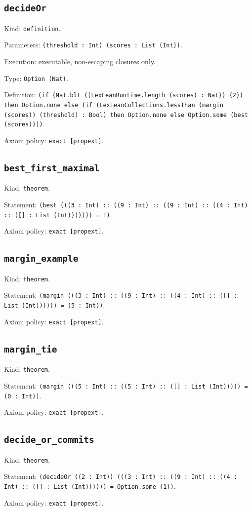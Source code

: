 \documentclass[11pt]{article}
\begin{document}
\subsection*{\texttt{decideOr}}
\noindent Kind: \texttt{definition}.\par
\noindent Parameters: \texttt{(threshold : Int) (scores : List (Int))}.\par
\noindent Execution: executable, non-escaping closures only.\par
\noindent Type: \texttt{Option (Nat)}.\par
\noindent Definition: \texttt{(if (Nat.blt ((LexLeanRuntime.length (scores) : Nat)) (2)) then Option.none else (if (LexLeanCollections.lessThan (margin (scores)) (threshold) : Bool) then Option.none else Option.some (best (scores))))}.\par
\noindent Axiom policy: \texttt{exact [propext]}.\par
\subsection*{\texttt{best\_first\_maximal}}
\noindent Kind: \texttt{theorem}.\par
\noindent Statement: \texttt{(best (((3 : Int) :: ((9 : Int) :: ((9 : Int) :: ((4 : Int) :: ([] : List (Int))))))) = 1)}.\par
\noindent Axiom policy: \texttt{exact [propext]}.\par
\subsection*{\texttt{margin\_example}}
\noindent Kind: \texttt{theorem}.\par
\noindent Statement: \texttt{(margin (((3 : Int) :: ((9 : Int) :: ((4 : Int) :: ([] : List (Int)))))) = (5 : Int))}.\par
\noindent Axiom policy: \texttt{exact [propext]}.\par
\subsection*{\texttt{margin\_tie}}
\noindent Kind: \texttt{theorem}.\par
\noindent Statement: \texttt{(margin (((5 : Int) :: ((5 : Int) :: ([] : List (Int))))) = (0 : Int))}.\par
\noindent Axiom policy: \texttt{exact [propext]}.\par
\subsection*{\texttt{decide\_or\_commits}}
\noindent Kind: \texttt{theorem}.\par
\noindent Statement: \texttt{(decideOr ((2 : Int)) (((3 : Int) :: ((9 : Int) :: ((4 : Int) :: ([] : List (Int)))))) = Option.some (1))}.\par
\noindent Axiom policy: \texttt{exact [propext]}.\par
\end{document}
